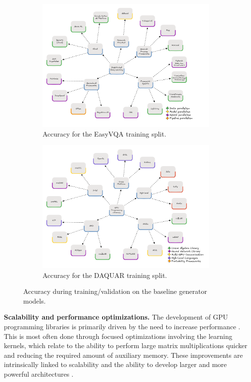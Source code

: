 \begin{figure}
	\centering
	\begin{subfigure}{0.48\linewidth}
		\includegraphics[width=\textwidth]{figures/mindmap}
		\caption{Accuracy for the EasyVQA training split.}
		\label{fig:base-a}
	\end{subfigure}
	\hfill
	\begin{subfigure}{0.48\linewidth}
		\includegraphics[width=\textwidth]{figures/mindmap-cuda}
		\caption{Accuracy for the DAQUAR training split.}
		\label{fig:base-b}
	\end{subfigure}
	\caption{Accuracy during training/validation on the baseline generator models.}
	\label{fig:base}
\end{figure}
\textbf{Scalability and performance optimizations.}
The development of GPU programming libraries is primarily driven by the need to increase
performance . This is most often done through focused
optimizations involving the learning kernels, which relate to the ability to perform
large matrix multiplications quicker and reducing the required amount of auxiliary memory. These
improvements are intrinsically linked to scalability and the ability to develop larger and more
powerful architectures . 

